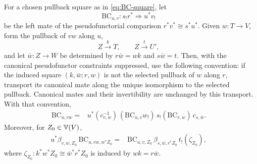 \begin{lemma}
\label{lem:BC-pasting}
For a chosen pullback square as in \cref{eq:BC-square}, let
\[
  \mathrm{BC}_{u,v}:s_!r^*\Longrightarrow u^*v_!
\]
be the left mate of the pseudofunctorial comparison
\(r^*v^*\cong s^*u^*\).  Given \(w:T\to V\), form the pullback of
\(vw\) along \(u\),
\[
  Z\xrightarrow{k}T,\qquad Z\xrightarrow{t}U',
\]
and let \(\bar w:Z\to W\) be determined by
\(r\bar w=wk\) and \(s\bar w=t\).  Then, with the canonical
pseudofunctor constraints suppressed, use the following convention: if the
induced square \((k,\bar w;r,w)\) is not the selected pullback of \(w\)
along \(r\), transport its canonical mate along the unique isomorphism to
the selected pullback.  Canonical mates and their invertibility are
unchanged by this transport.  With that convention,
\begin{equation}
\begin{split}
  \mathrm{BC}_{u,vw}
  ={}&u^*(c_{v,w}^{-1})\,
      (\mathrm{BC}_{u,v}w_!)\,
      s_!(\mathrm{BC}_{r,w})\,
      c_{s,\bar w}.
\end{split}
\label{eq:BC-pasting}
\end{equation}
Moreover, for \(Z_0\in\mathbb{V}(V)\),
\begin{equation}
\begin{split}
 u^*\beta_{v,w,Z_0}\,
 \mathrm{BC}_{u,vw,w^*Z_0}
 ={}&
 \mathrm{BC}_{u,v,Z_0}\,
 \beta_{s,\bar w,r^*Z_0}\,
 t_!(\zeta_{Z_0}),
\end{split}
\label{eq:BC-beta}
\end{equation}
where
\(\zeta_{Z_0}:k^*w^*Z_0\cong\bar w^*r^*Z_0\) is induced by
\(wk=r\bar w\).
\end{lemma}

